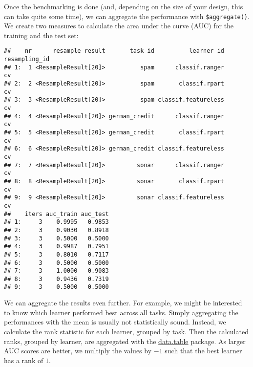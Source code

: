 \documentclass[
]{scrbook}
\newenvironment{Shaded}{\begin{snugshade}}{\end{snugshade}}
\newcommand{\AttributeTok}[1]{\textcolor[rgb]{0.77,0.63,0.00}{#1}}
\newcommand{\FunctionTok}[1]{\textcolor[rgb]{0.00,0.00,0.00}{#1}}
\newcommand{\NormalTok}[1]{#1}
\newcommand{\OtherTok}[1]{\textcolor[rgb]{0.56,0.35,0.01}{#1}}
\newcommand{\SpecialCharTok}[1]{\textcolor[rgb]{0.00,0.00,0.00}{#1}}
\newcommand{\StringTok}[1]{\textcolor[rgb]{0.31,0.60,0.02}{#1}}
\renewenvironment{Shaded} {\begin{snugshade}\small} {\end{snugshade}}
\begin{document}
Once the benchmarking is done (and, depending on the size of your design, this can take quite some time), we can aggregate the performance with \texttt{\$aggregate()}.
We create two measures to calculate the area under the curve (AUC) for the training and the test set:

\begin{Shaded}
\end{Shaded}

\begin{verbatim}
##    nr      resample_result       task_id          learner_id resampling_id
## 1:  1 <ResampleResult[20]>          spam      classif.ranger            cv
## 2:  2 <ResampleResult[20]>          spam       classif.rpart            cv
## 3:  3 <ResampleResult[20]>          spam classif.featureless            cv
## 4:  4 <ResampleResult[20]> german_credit      classif.ranger            cv
## 5:  5 <ResampleResult[20]> german_credit       classif.rpart            cv
## 6:  6 <ResampleResult[20]> german_credit classif.featureless            cv
## 7:  7 <ResampleResult[20]>         sonar      classif.ranger            cv
## 8:  8 <ResampleResult[20]>         sonar       classif.rpart            cv
## 9:  9 <ResampleResult[20]>         sonar classif.featureless            cv
##    iters auc_train auc_test
## 1:     3    0.9995   0.9853
## 2:     3    0.9030   0.8918
## 3:     3    0.5000   0.5000
## 4:     3    0.9987   0.7951
## 5:     3    0.8010   0.7117
## 6:     3    0.5000   0.5000
## 7:     3    1.0000   0.9083
## 8:     3    0.9436   0.7319
## 9:     3    0.5000   0.5000
\end{verbatim}

We can aggregate the results even further.
For example, we might be interested to know which learner performed best across all tasks.
Simply aggregating the performances with the mean is usually not statistically sound.
Instead, we calculate the rank statistic for each learner, grouped by task.
Then the calculated ranks, grouped by learner, are aggregated with the \href{https://cran.r-project.org/package=data.table}{data.table} package.
As larger AUC scores are better, we multiply the values by \(-1\) such that the best learner has a rank of \(1\).
\end{document}
